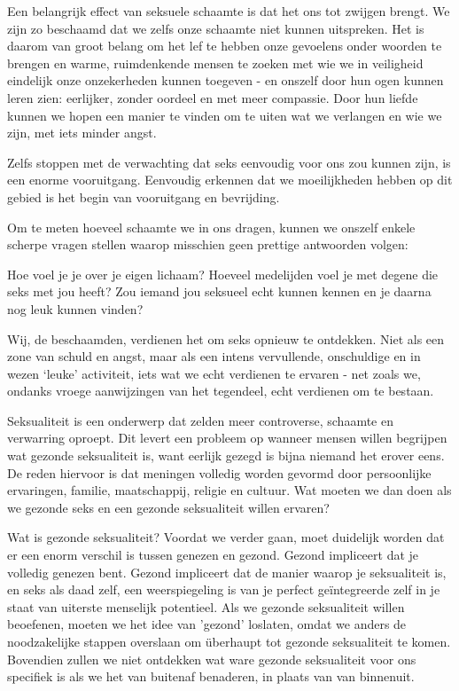 Een belangrijk effect van seksuele schaamte is dat het ons tot zwijgen brengt. We zijn zo beschaamd dat we zelfs onze schaamte niet kunnen uitspreken. Het is daarom van groot belang om het lef te hebben onze gevoelens onder woorden te brengen en warme, ruimdenkende mensen te zoeken met wie we in veiligheid eindelijk onze onzekerheden kunnen toegeven - en onszelf door hun ogen kunnen leren zien: eerlijker, zonder oordeel en met meer compassie. Door hun liefde kunnen we hopen een manier te vinden om te uiten wat we verlangen en wie we zijn, met iets minder angst.

Zelfs stoppen met de verwachting dat seks eenvoudig voor ons zou kunnen zijn, is een enorme vooruitgang. Eenvoudig erkennen dat we moeilijkheden hebben op dit gebied is het begin van vooruitgang en bevrijding.

Om te meten hoeveel schaamte we in ons dragen, kunnen we onszelf enkele scherpe vragen stellen waarop misschien geen prettige antwoorden volgen:

Hoe voel je je over je eigen lichaam?
Hoeveel medelijden voel je met degene die seks met jou heeft?
Zou iemand jou seksueel echt kunnen kennen en je daarna nog leuk kunnen vinden?

Wij, de beschaamden, verdienen het om seks opnieuw te ontdekken. Niet als een zone van schuld en angst, maar als een intens vervullende, onschuldige en in wezen ‘leuke’ activiteit, iets wat we echt verdienen te ervaren - net zoals we, ondanks vroege aanwijzingen van het tegendeel, echt verdienen om te bestaan.

Seksualiteit is een onderwerp dat zelden meer controverse, schaamte en verwarring oproept. Dit levert een probleem op wanneer mensen willen begrijpen wat gezonde seksualiteit is, want eerlijk gezegd is bijna niemand het erover eens. De reden hiervoor is dat meningen volledig worden gevormd door persoonlijke ervaringen, familie, maatschappij, religie en cultuur. Wat moeten we dan doen als we gezonde seks en een gezonde seksualiteit willen ervaren?

Wat is gezonde seksualiteit? Voordat we verder gaan, moet duidelijk worden dat er een enorm verschil is tussen genezen en gezond. Gezond impliceert dat je volledig genezen bent. Gezond impliceert dat de manier waarop je seksualiteit is, en seks als daad zelf, een weerspiegeling is van je perfect geïntegreerde zelf in je staat van uiterste menselijk potentieel. Als we gezonde seksualiteit willen beoefenen, moeten we het idee van 'gezond' loslaten, omdat we anders de noodzakelijke stappen overslaan om überhaupt tot gezonde seksualiteit te komen. Bovendien zullen we niet ontdekken wat ware gezonde seksualiteit voor ons specifiek is als we het van buitenaf benaderen, in plaats van van binnenuit.

